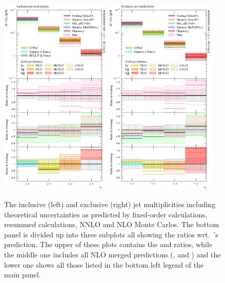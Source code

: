 

\begin{figure}[t!]
  \centering
  \includegraphics[width=0.47\textwidth]{figures/hjetscomp_NJet_incl_30.pdf}
  \hfill
  \includegraphics[width=0.47\textwidth]{figures/hjetscomp_NJet_excl_30.pdf}
  \caption{\label{fig:higgscomp:results:inclobs:njets}%
    The inclusive (left) and exclusive (right) jet multiplicities
    including theoretical uncertainties as predicted by fixed-order
    calculations, resummed calculations, NNLO and NLO Monte Carlos. The
    bottom panel is divided up into three subplots all showing the
    ratios wrt.~\Powheg's \NNLOPS prediction. The upper of these plots
    contains the \Hej and \Sherpa \NNLOPS ratios, while the middle one
    includes all NLO merged predictions (\MGaMC, \Herwig and \Sherpa)
    and the lower one shows all those listed in the bottom left legend
    of the main panel.}
\end{figure}

